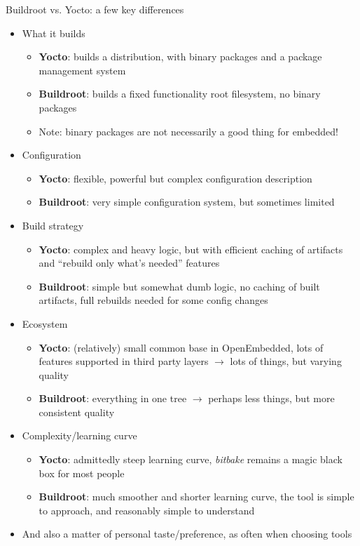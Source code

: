 \begin{frame}{Buildroot vs. Yocto: a few key differences}
  \begin{itemize}
  \item What it builds
     {
      \begin{itemize}
      \item {\bf Yocto}: builds a distribution, with binary packages and a
        package management system
      \item {\bf Buildroot}: builds a fixed functionality root
        filesystem, no binary packages
      \item Note: binary packages are not necessarily a good thing for
        embedded!
      \end{itemize}
    }
    \pause
  \item Configuration
     {
      \begin{itemize}
      \item {\bf Yocto}: flexible, powerful but complex configuration
        description
      \item {\bf Buildroot}: very simple configuration system, but
        sometimes limited
      \end{itemize}
    }
    \pause
  \item Build strategy
     {
      \begin{itemize}
      \item {\bf Yocto}: complex and heavy logic, but with efficient
        caching of artifacts and ``rebuild only what's needed'' features
      \item {\bf Buildroot}: simple but somewhat dumb logic, no caching
        of built artifacts, full rebuilds needed for some config changes
      \end{itemize}
    }
    \pause
  \item Ecosystem
     {
      \begin{itemize}
      \item {\bf Yocto}: (relatively) small common base in OpenEmbedded,
        lots of features supported in third party layers $\rightarrow$
        lots of things, but varying quality
      \item {\bf Buildroot}: everything in one tree $\rightarrow$
        perhaps less things, but more consistent quality
      \end{itemize}
    }
    \pause
  \item Complexity/learning curve
     {
      \begin{itemize}
      \item {\bf Yocto}: admittedly steep learning curve, {\em bitbake}
        remains a magic black box for most people
      \item {\bf Buildroot}: much smoother and shorter learning curve,
        the tool is simple to approach, and reasonably simple to
        understand
      \end{itemize}
    }
    \pause
  \item And also a matter of personal taste/preference, as often when
    choosing tools
  \end{itemize}
\end{frame}


